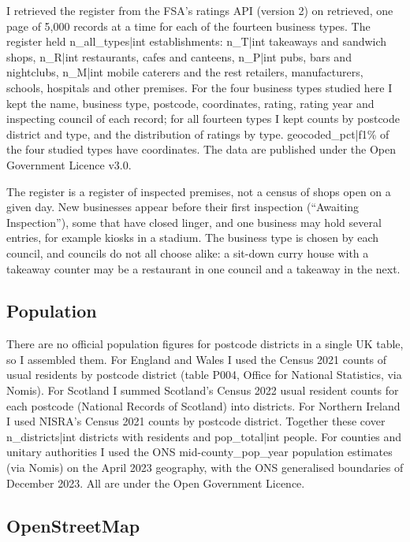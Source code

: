 \documentclass[11pt,a4paper]{article}
\begin{document}
I retrieved the register from the FSA's ratings API (version 2) on {{retrieved}}, one page of 5,000 records at a time for each of the fourteen business types. The register held {{n_all_types|int}} establishments: {{n_T|int}} takeaways and sandwich shops, {{n_R|int}} restaurants, cafes and canteens, {{n_P|int}} pubs, bars and nightclubs, {{n_M|int}} mobile caterers and the rest retailers, manufacturers, schools, hospitals and other premises. For the four business types studied here I kept the name, business type, postcode, coordinates, rating, rating year and inspecting council of each record; for all fourteen types I kept counts by postcode district and type, and the distribution of ratings by type. {{geocoded_pct|f1}}\% of the four studied types have coordinates. The data are published under the Open Government Licence v3.0.

The register is a register of inspected premises, not a census of shops open on a given day. New businesses appear before their first inspection (``Awaiting Inspection''), some that have closed linger, and one business may hold several entries, for example kiosks in a stadium. The business type is chosen by each council, and councils do not all choose alike: a sit-down curry house with a takeaway counter may be a restaurant in one council and a takeaway in the next.

\subsection{Population}

There are no official population figures for postcode districts in a single UK table, so I assembled them. For England and Wales I used the Census 2021 counts of usual residents by postcode district (table P004, Office for National Statistics, via Nomis). For Scotland I summed Scotland's Census 2022 usual resident counts for each postcode (National Records of Scotland) into districts. For Northern Ireland I used NISRA's Census 2021 counts by postcode district. Together these cover {{n_districts|int}} districts with residents and {{pop_total|int}} people. For counties and unitary authorities I used the ONS mid-{{county_pop_year}} population estimates (via Nomis) on the April 2023 geography, with the ONS generalised boundaries of December 2023. All are under the Open Government Licence.

\subsection{OpenStreetMap}
\end{document}
